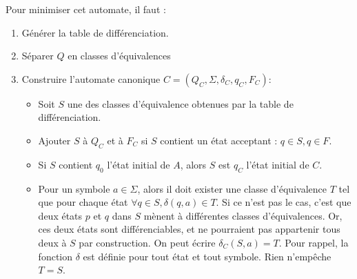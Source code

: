 	 Pour minimiser cet automate, il faut :
	 \begin{enumerate}
	 	\item Générer la table de différenciation.
	 	\item Séparer $Q$ en classes d'équivalences
	 	\item Construire l'automate canonique $C=(Q_C,\Sigma, \delta_C, q_C, F_C)$:
	 	\begin{itemize}
	 		\item Soit $S$ une des classes d'équivalence obtenues par la table de différenciation.
	 		\item Ajouter $S$ à $Q_C$ et à $F_C$ si $S$ contient un état acceptant : $q\in S, q\in F$.
	 		\item Si $S$ contient $q_0$ l'état initial de $A$, alors $S$ est $q_C$ l'état initial de $C$.
	 		\item Pour un symbole $a \in \Sigma$, alors il doit exister une classe d'équivalence $T$ tel que pour chaque état $\forall q \in S,\delta(q,a) \in T$. Si ce n'est pas le cas, c'est que deux états $p$ et $q$ dans $S$ mènent à différentes classes d'équivalences. Or, ces deux états sont différenciables, et ne pourraient pas appartenir tous deux à $S$ par construction. On peut écrire $\delta_C(S,a)=T$. Pour rappel, la fonction $\delta$ est définie pour tout état et tout symbole. Rien n'empêche $T=S$.
	 	\end{itemize}
	 \end{enumerate}
	 
